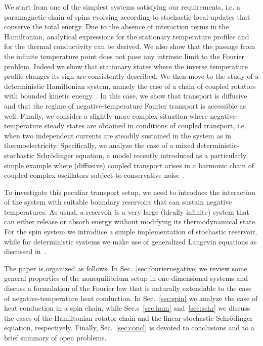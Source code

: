 \documentclass[iop, twocolumns, amssymb,notitlepage]{revtex4-1}
\begin{document}
 We start from one of the simplest systems satisfying our requirements, i.e. a paramagnetic chain of spins evolving according to stochastic local updates that conserve the total energy. Due to the absence of interaction terms
in the Hamiltonian, analytical expressions for the stationary temperature profiles and for the thermal conductivity can
be derived. We also show that the passage from the infinite temperature point does not pose any intrinsic limit to
the Fourier problem. Indeed we show that stationary states where the inverse temperature profile changes its sign are 
consistently described.
We then move to the study of a deterministic Hamiltonian system, namely the case of a chain of coupled rotators with bounded kinetic energy~\cite{cerino15, baldovin17, baldovin18}. In this case, we show that transport is diffusive and that the regime of  negative-temperature Fourier transport is accessible as well. Finally, we consider a slightly more complex situation where negative-temperature steady states are obtained in conditions
of coupled transport, i.e. when two independent currents are steadily sustained in the system as in thermoelectricity. Specifically, we 
analyze the case of a mixed deterministic-stochastic Schr\"odinger equation, a model recently introduced as a particularly simple
example where (diffusive) coupled transport arises in a harmonic chain of coupled complex oscillators subject to conservative noise~\cite{iubini19}. 

To investigate this peculiar transport setup, we need to introduce the interaction of
the system with suitable boundary reservoirs that can sustain negative temperatures. As usual, a reservoir is a very
large (ideally infinite) system that can either release or absorb energy without modifying its thermodynamical state. 
For the spin system we introduce a simple implementation of stochastic reservoir, while for deterministic systems we make use
of generalized Langevin equations as discussed in~\cite{baldovin18}.



The paper is organized as follows. In Sec.~\ref{sec:fouriernegative} we review some general properties of the 
nonequilibrium setup in one-dimensional systems and discuss a formulation of the Fourier law  that is 
naturally 	extendable to the case of negative-temperature heat conduction.
In Sec.~\ref{sec:spin} we analyze the case of heat conduction in a spin chain, while  Sec.s~\ref{sec:ham}
and~\ref{sec:schr} we discuss the cases of the Hamiltonian rotator chain and the linear-stochastic Schr\"odinger
equation, respectively. Finally, Sec.~\ref{sec:concl} is devoted to conclusions and to a brief summary of open 
problems. 
\end{document}

